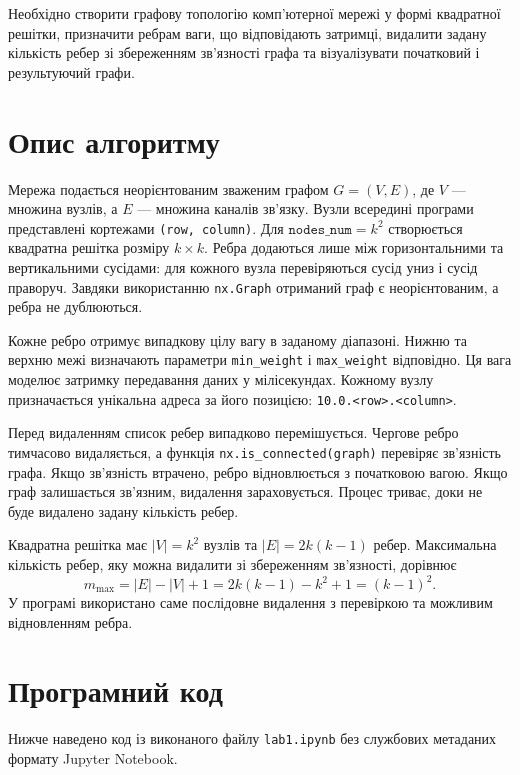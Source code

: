 \documentclass[12pt,a4paper]{article}
\begin{document}
Необхідно створити графову топологію комп'ютерної мережі у формі квадратної
решітки, призначити ребрам ваги, що відповідають затримці, видалити задану
кількість ребер зі збереженням зв'язності графа та візуалізувати початковий і
результуючий графи.

\section{Опис алгоритму}

Мережа подається неорієнтованим зваженим графом \(G=(V,E)\), де \(V\) ---
множина вузлів, а \(E\) --- множина каналів зв'язку. Вузли всередині програми
представлені кортежами \texttt{(row, column)}. Для
\(\texttt{nodes\_num}=k^2\) створюється квадратна решітка розміру
\(k\times k\). Ребра додаються лише між горизонтальними та вертикальними
сусідами: для кожного вузла перевіряються сусід униз і сусід праворуч. Завдяки
використанню \texttt{nx.Graph} отриманий граф є неорієнтованим, а ребра не
дублюються.

Кожне ребро отримує випадкову цілу вагу в заданому діапазоні. Нижню та верхню
межі визначають параметри \texttt{min\_weight} і \texttt{max\_weight}
відповідно. Ця вага моделює затримку передавання даних у мілісекундах. Кожному
вузлу призначається унікальна адреса за його позицією:
\texttt{10.0.<row>.<column>}.

Перед видаленням список ребер випадково перемішується. Чергове ребро тимчасово
видаляється, а функція \texttt{nx.is\_connected(graph)} перевіряє зв'язність
графа. Якщо зв'язність втрачено, ребро відновлюється з початковою вагою. Якщо
граф залишається зв'язним, видалення зараховується. Процес триває, доки не
буде видалено задану кількість ребер.

Квадратна решітка має \(|V|=k^2\) вузлів та \(|E|=2k(k-1)\) ребер.
Максимальна кількість ребер, яку можна видалити зі збереженням зв'язності,
дорівнює
\begin{equation}
  m_{\max}=|E|-|V|+1
  =2k(k-1)-k^2+1
  =(k-1)^2.
\end{equation}
У програмі використано саме послідовне видалення з перевіркою та можливим
відновленням ребра.

\section{Програмний код}

Нижче наведено код із виконаного файлу \texttt{lab1.ipynb} без службових
метаданих формату Jupyter Notebook.
\end{document}
